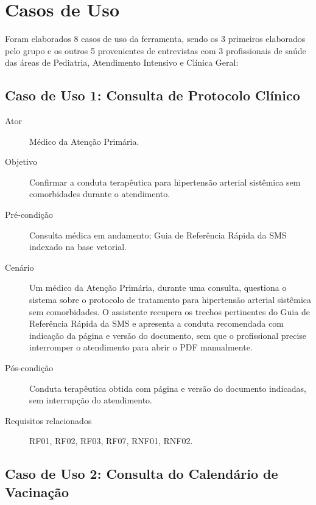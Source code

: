 \documentclass[conference,a4paper]{IEEEtran}
\begin{document}

\section{Casos de Uso}
\label{sec:results}

Foram elaborados 8 casos de uso da ferramenta, sendo os 3 primeiros elaborados pelo grupo e os outros 5 provenientes de entrevistas com 3 profissionais de saúde das áreas de Pediatria, Atendimento Intensivo e Clínica Geral:

\subsection{Caso de Uso 1: Consulta de Protocolo Clínico}

\begin{description}
  \item[Ator] Médico da Atenção Primária.
  \item[Objetivo] Confirmar a conduta terapêutica para hipertensão arterial sistêmica sem comorbidades durante o atendimento.
  \item[Pré-condição] Consulta médica em andamento; Guia de Referência Rápida da SMS indexado na base vetorial.
  \item[Cenário] Um médico da Atenção Primária, durante uma consulta, questiona o sistema sobre o protocolo de tratamento para hipertensão arterial sistêmica sem comorbidades. O assistente recupera os trechos pertinentes do Guia de Referência Rápida da SMS e apresenta a conduta recomendada com indicação da página e versão do documento, sem que o profissional precise interromper o atendimento para abrir o PDF manualmente.
  \item[Pós-condição] Conduta terapêutica obtida com página e versão do documento indicadas, sem interrupção do atendimento.
  \item[Requisitos relacionados] RF01, RF02, RF03, RF07, RNF01, RNF02.
\end{description}

\subsection{Caso de Uso 2: Consulta do Calendário de Vacinação}
\end{document}
